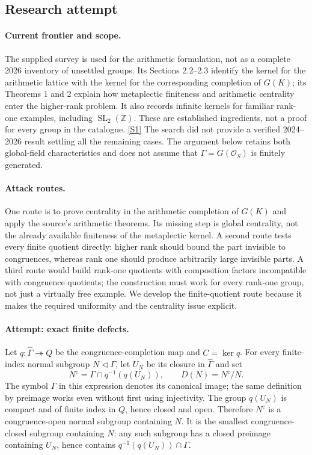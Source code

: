 \documentclass[11pt,a4paper]{article}
\newcommand{\Z}{\mathbb{Z}}
\newcommand{\sref}[2]{\hyperlink{source:#1:#2}{[S#2]}}
\numberwithin{equation}{section}
\begin{document}
\subsection{Research attempt}

\paragraph{Current frontier and scope.}
The supplied survey is used for the arithmetic formulation, not as a
complete 2026 inventory of unsettled groups.  Its Sections 2.2--2.3 identify
the kernel for the arithmetic lattice with the kernel for the corresponding
completion of $G(K)$; its Theorems 1 and 2 explain how metaplectic finiteness
and arithmetic centrality enter the higher-rank problem.  It also records
infinite kernels for familiar rank-one examples, including
$\operatorname{SL}_2(\Z)$.  These are established ingredients, not a proof
for every group in the catalogue. \sref{30006737}{1}
The search did not provide a verified 2024--2026 result settling all the
remaining cases.  The argument below retains both global-field
characteristics and does not assume that $\Gamma=G(\mathcal O_S)$ is
finitely generated.

\paragraph{Attack routes.}
One route is to prove centrality in the arithmetic completion of $G(K)$
and apply the source's arithmetic theorems.  Its missing step is global
centrality, not the already available finiteness of the metaplectic
kernel.  A second route tests every finite quotient directly: higher rank
should bound the part invisible to congruences, whereas rank one should
produce arbitrarily large invisible parts.  A third route would build
rank-one quotients with composition factors incompatible with congruence
quotients; the construction must work for every rank-one group, not just
a virtually free example.  We develop the finite-quotient route because
it makes the required uniformity and the centrality issue explicit.

\paragraph{Attempt: exact finite defects.}
Let $q:\widehat\Gamma\twoheadrightarrow Q$ be the congruence-completion
map and $C=\ker q$.  For every finite-index normal subgroup
$N\triangleleft\Gamma$, let $U_N$ be its closure in $\widehat\Gamma$ and
set
\[
 N^{\mathrm c}=\Gamma\cap q^{-1}(q(U_N)),\qquad
 D(N)=N^{\mathrm c}/N.
\]
The symbol $\Gamma$ in this expression denotes its canonical image; the
same definition by preimage works even without first using injectivity.
The group $q(U_N)$ is compact and of finite index in $Q$, hence closed
and open.  Therefore $N^{\mathrm c}$ is a congruence-open normal subgroup
containing $N$.  It is the smallest congruence-closed subgroup containing
$N$: any such subgroup has a closed preimage containing $U_N$, hence
contains $q^{-1}(q(U_N))\cap\Gamma$.
\end{document}
